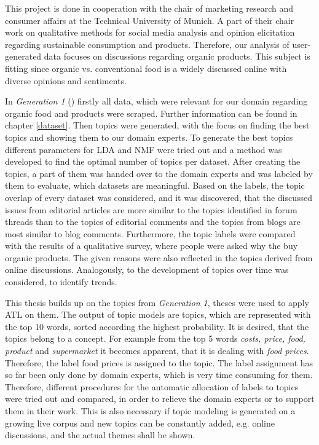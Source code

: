 This project is done in cooperation with the chair of marketing research and consumer affairs at the Technical University of Munich. A part of their chair work on qualitative methods for social media analysis and opinion elicitation regarding sustainable consumption and products. Therefore, our analysis of user-generated data focuses on discussions regarding organic products. This subject is fitting since organic vs. conventional food is a widely discussed online with diverse opinions and sentiments.

In \textit{Generation 1} (\cite{Widmer2018}) firstly all data, which were relevant for our domain regarding organic food and products were scraped. Further information can be found in chapter \ref{dataset}. Then topics were generated, with the focus on finding the best topics and showing them to our domain experts. To generate the best topics different parameters for \acf{LDA} and \acf{NMF} were tried out and a method was developed to find the optimal number of topics per dataset. After creating the topics, a part of them was handed over to the domain experts and was labeled by them to evaluate, which datasets are meaningful. Based on the labels, the topic overlap  of every dataset was considered, and it was discovered, that the discussed issues from editorial articles are more similar to the topics identified in forum threads than to the topics of editorial comments and the topics from blogs are most similar to blog comments. Furthermore, the topic labels were compared with the results of a qualitative survey, where people were asked why the buy organic products. The given reasons were also reflected in the topics derived from online discussions. Analogously, to \cite{Griffiths2004} the development of topics over time was considered, to identify trends.

This thesis builds up on the topics from \textit{Generation 1}, theses were used to apply \acf{ATL} on them. The output of topic models are topics, which are represented with the top 10 words, sorted according the highest probability. It is desired, that the topics belong to a concept. For example from the top 5 words \textit{costs, price, food, product} and \textit{supermarket} it becomes apparent, that it is dealing with \textit{food prices}. Therefore, the label food prices is assigned to the topic. The label assignment has so far been only done by domain experts, which is very time consuming for them. Therefore, different procedures for the automatic allocation of labels to topics were tried out and compared, in order to relieve the domain experts or to support them in their work. This is also necessary if topic modeling is generated on a growing live corpus and new topics can be constantly added, e.g. online discussions, and the actual themes shall be shown.

